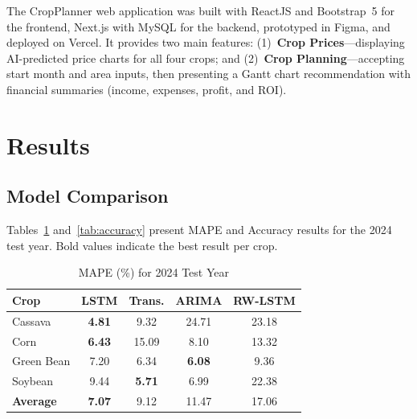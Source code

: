 \documentclass[conference]{IEEEtran}
\begin{document}
The CropPlanner web application was built with ReactJS and Bootstrap~5 for the frontend, Next.js with MySQL for the backend, prototyped in Figma, and deployed on Vercel. It provides two main features: (1)~\textbf{Crop Prices}---displaying AI-predicted price charts for all four crops; and (2)~\textbf{Crop Planning}---accepting start month and area inputs, then presenting a Gantt chart recommendation with financial summaries (income, expenses, profit, and ROI).

\section{Results}

\subsection{Model Comparison}

Tables~\ref{tab:mape} and~\ref{tab:accuracy} present MAPE and Accuracy results for the 2024 test year. Bold values indicate the best result per crop.

\begin{table}[htbp]
  \centering
  \caption{MAPE (\%) for 2024 Test Year}
  \label{tab:mape}
  \begin{tabular}{lcccc}
    \toprule
    \textbf{Crop} & \textbf{LSTM} & \textbf{Trans.} & \textbf{ARIMA} & \textbf{RW-LSTM} \\
    \midrule
    Cassava    & \textbf{4.81}  & 9.32  & 24.71 & 23.18 \\
    Corn       & \textbf{6.43}  & 15.09 & 8.10  & 13.32 \\
    Green Bean & 7.20           & 6.34  & \textbf{6.08}  & 9.36  \\
    Soybean    & 9.44           & \textbf{5.71} & 6.99 & 22.38 \\
    \midrule
    \textbf{Average} & \textbf{7.07} & 9.12 & 11.47 & 17.06 \\
    \bottomrule
  \end{tabular}
\end{table}
\end{document}
